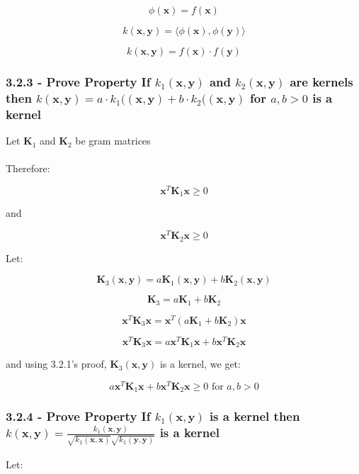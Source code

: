 \documentclass[10pt]{article}
\begin{document}
\[
\phi(\textbf{x}) = f(\textbf{x})
\]

\[
k(\textbf{x},\textbf{y}) = \langle \phi(\textbf{x}), \phi(\textbf{y}) \rangle
\]

\[
k(\textbf{x},\textbf{y}) = f(\textbf{x}) \cdot f(\textbf{y})
\]


\subsubsection{3.2.3 - Prove Property If $k_1(\textbf{x},\textbf{y})$ and $k_2(\textbf{x},\textbf{y})$ are kernels then $k(\textbf{x},\textbf{y}) = a \cdot k_1((\textbf{x},\textbf{y}) + b \cdot k_2((\textbf{x},\textbf{y})$ for $a,b > 0$ is a kernel}

Let $\textbf{K}_1$ and $\textbf{K}_2$ be gram matrices
\\ \\
Therefore: 

\[
\textbf{x}^{T} \textbf{K}_1 \textbf{x} \geq 0
\]

and 

\[
\textbf{x}^{T} \textbf{K}_2 \textbf{x} \geq 0
\]
 
Let: 

\[
\textbf{K}_{3}(\textbf{x},\textbf{y}) = a \textbf{K}_{1}(\textbf{x},\textbf{y}) + b  \textbf{K}_{2}(\textbf{x},\textbf{y})
\]

\[
\textbf{K}_{3} = a \textbf{K}_{1} + b  \textbf{K}_{2}
\]

\[
\textbf{x}^{T} \textbf{K}_3 \textbf{x} = \textbf{x}^{T} ( a \textbf{K}_{1} + b  \textbf{K}_{2}) \textbf{x}
\]

\[
\textbf{x}^{T} \textbf{K}_3 \textbf{x} = a \textbf{x}^{T} \textbf{K}_1 \textbf{x} + b \textbf{x}^{T} \textbf{K}_2 \textbf{x}
\]

and using 3.2.1's proof, $\textbf{K}_{3}(\textbf{x},\textbf{y})$ is a kernel, we get: 

\[
a \textbf{x}^{T} \textbf{K}_1 \textbf{x} + b \textbf{x}^{T} \textbf{K}_2 \textbf{x} \geq 0 \text{ for } a,b > 0
\]


\subsubsection{3.2.4 - Prove Property If $k_1(\textbf{x},\textbf{y})$ is a kernel then $k(\textbf{x},\textbf{y}) = \frac{k_1(\textbf{x},\textbf{y})}{\sqrt{k_1(\textbf{x},\textbf{x})} \sqrt{k_1(\textbf{y},\textbf{y})}}$ is a kernel}

Let:
\end{document}
